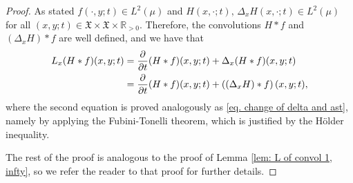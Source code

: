 \documentclass[11pt,reqno]{amsart}
\theoremstyle{remark}
\theoremstyle{definition}
\numberwithin{theorem}{section} \numberwithin{equation}{section}
\newcommand{\X}{\mathfrak{X}}
\begin{document}
\begin{proof} As stated $f(\cdot, y;t)\in L^{2}(\mu)$ and $H(x,\cdot;t), \, \Delta_{x}H(x,\cdot;t)\in L^2(\mu)$
for all $(x,y;t) \in \X\times \X \times \mathbb{R}_{> 0}$.  Therefore, the convolutions $H\ast f$ and $(\Delta_{x}H)\ast f$ are well defined,
and we have that
\begin{align}\notag
L_{x}(H\ast f)(x,y;t)&=
    \frac{\partial}{\partial t}(H\ast f)(x,y;t)
    + \Delta_{x}(H\ast f)(x,y;t)\\ &=
  \frac{\partial}{\partial t}(H\ast f)(x,y;t)+  \left( (\Delta_{x}H)\ast f\right)(x,y;t),\label{eq:heat_of_convolution}
\end{align}
where the second equation is proved analogously as \eqref{eq. change of delta and ast}, namely by
applying the Fubini-Tonelli theorem, which is justified by the H\"older inequality.

The rest of the proof is analogous to the proof of Lemma \ref{lem: L of convol 1, infty}, so we refer the reader to that
proof for further details.
\end{proof}


\end{document}
